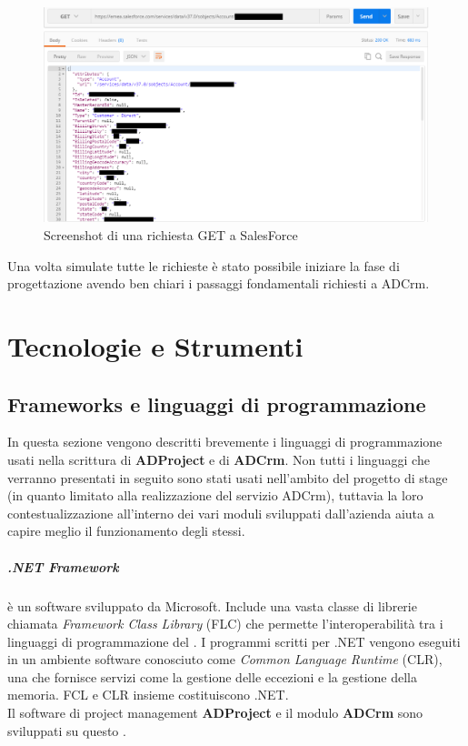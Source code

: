 \documentclass[12pt,a4paper,twoside,openany,english]{book}
\begin{document}
			\begin{figure}[!hb]
				\centering
				\includegraphics[width=\linewidth]{images/postman}
				\caption{Screenshot di una richiesta GET a SalesForce}
				\label{fig:postman}
			\end{figure}
			Una volta simulate tutte le richieste è stato possibile iniziare la fase di progettazione avendo ben chiari i passaggi fondamentali richiesti a ADCrm.
		
\chapter{Tecnologie e Strumenti}\label{tecnologie}
\section{Frameworks e linguaggi di programmazione}
In questa sezione vengono descritti brevemente i linguaggi di programmazione usati nella scrittura di \textbf{ADProject} e di \textbf{ADCrm}.
Non tutti i linguaggi che verranno presentati in seguito sono stati usati nell'ambito del progetto di stage (in quanto limitato alla realizzazione del servizio ADCrm), tuttavia la loro contestualizzazione all'interno dei vari moduli sviluppati dall'azienda aiuta a capire meglio il funzionamento degli stessi.

\paragraph{.NET Framework}
è un  software sviluppato da Microsoft. Include una vasta classe di librerie chiamata \textit{Framework Class Library} (FLC) che permette l'interoperabilità tra i linguaggi di programmazione del . I programmi scritti per .NET vengono eseguiti in un ambiente software conosciuto come \textit{Common Language Runtime} (CLR), una \textit{}  che fornisce servizi come la gestione delle eccezioni e la gestione della memoria. FCL e CLR insieme costituiscono .NET.\\
Il software di project management \textbf{ADProject} e il modulo \textbf{ADCrm} sono sviluppati su questo .
\end{document}
